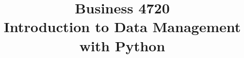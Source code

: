 \documentclass{article}
\title{Business 4720\\ \vspace{\baselineskip}
Introduction to Data Management with Python}
\begin{document}
\maketitle

\vfill

\clearpage


\end{document}
